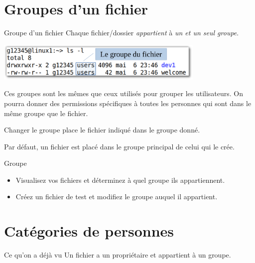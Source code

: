 \documentclass[a4paper,11pt]{style-esi/td}
\begin{document}
	\section{Groupes d'un fichier}

		\begin{theorie}{Groupe d'un fichier}
			Chaque fichier/dossier \emph{appartient} à \emph{un et un seul groupe}.
		\end{theorie}

		\begin{center}
			\includegraphics[height=5em]{image/group}
		\end{center}

		Ces groupes sont les mêmes que ceux utilisés pour grouper les utilisateurs.
		On pourra donner des permissions spécifiques à toutes les personnes
		qui sont dans le même groupe que le fichier.

		\begin{theorie}{Changer le groupe}
			place le fichier indiqué dans le groupe donné.
		\end{theorie}

		Par défaut, un fichier est placé dans le groupe principal de celui qui le crée.

		\begin{Exercice}{Groupe}
			\vspace{-1em}
			\begin{itemize}
			\item Visualisez vos fichiers et déterminez à quel groupe ils appartiennent.
			\item Créez un fichier de test et modifiez le groupe auquel il appartient.
			\end{itemize}
		\end{Exercice}

	\section{Catégories de personnes}

		\begin{infotbox}{Ce qu'on a déjà vu}
			Un fichier a un propriétaire et appartient à un groupe.
		\end{infotbox}
\end{document}
